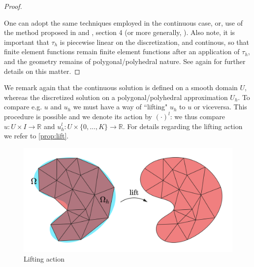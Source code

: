 \documentclass[english,a4paper,10pt,oneside]{scrbook}	%
\theoremstyle{break}
\newenvironment{mproof}[1][\proofname]{%
  \begin{proof}[#1]$ $\par\nobreak\ignorespaces
}{%
  \end{proof}
}
\renewcommand*{\proofname}{Proof}
\theoremstyle{remark}
\newcommand{\mR}{\mathbb{R}}
\begin{document}
\begin{mproof}
One can adopt the same techniques employed in the continuous case, or, use of the method proposed in and \cite{lindemann2}, section 4 (or more generally, \cite{lindemann}).
Also note, it is important that $\tau_h$ is piecewise linear on the discretization, and continous, so that finite element functions remain finite element functions after an application of $\tau_h$, and the geometry remains of polygonal/polyhedral nature. See again \cite{lindemann2} for further details on this matter.
\end{mproof}


We remark again that the continuous solution is defined on a smooth domain $U$, whereas the discretized solution on a polygonal/polyhedral approximation $U_h$. To compare e.g. $u$ and $u_h$ we must have a way of ``lifting" $u_h$ to $u$ or viceversa. This procedure is possible and we denote its action by $(\cdot)^l$: we thus compare $u: U\times I \rightarrow \mR$ and $u_h^l:U\times\{0,...,K\}\rightarrow \mR$. For details regarding the lifting action we refer to \cref{prop:lift}.

\begin{figure}[H]
\centering
\includegraphics[width=0.65\columnwidth]{Images/Lift.pdf}
\caption{Lifting action}\label{fig:lift}
\end{figure}
\end{document}
